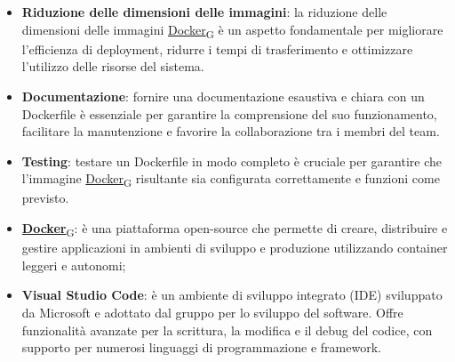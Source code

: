 \begin{itemize}
	\item \textbf{Riduzione delle dimensioni delle immagini}: la riduzione delle dimensioni delle immagini \href{https://7last.github.io/docs/rtb/documentazione-interna/glossario\#docker}{Docker\textsubscript{G}} è un aspetto fondamentale per migliorare l'efficienza di deployment, ridurre i tempi di trasferimento e ottimizzare l'utilizzo delle risorse del sistema.
	\item \textbf{Documentazione}: fornire una documentazione esaustiva e chiara con un Dockerfile è essenziale per garantire la comprensione del suo funzionamento, facilitare la manutenzione e favorire la collaborazione tra i membri del team.
	\item \textbf{Testing}: testare un Dockerfile in modo completo è cruciale per garantire che l'immagine \href{https://7last.github.io/docs/rtb/documentazione-interna/glossario\#docker}{Docker\textsubscript{G}} risultante sia configurata correttamente e funzioni come previsto.
\end{itemize}

\begin{itemize}
	\item \href{https://7last.github.io/docs/rtb/documentazione-interna/glossario\#docker}{\textbf{Docker}\textsubscript{G}}: è una piattaforma open-source che permette di creare, distribuire e gestire applicazioni in ambienti di sviluppo e produzione utilizzando container leggeri e autonomi;
	\item \textbf{Visual Studio Code}: è un ambiente di sviluppo integrato (IDE) sviluppato da Microsoft e adottato dal gruppo per lo sviluppo del software. Offre funzionalità avanzate per la scrittura, la modifica e il debug del codice, con supporto per numerosi linguaggi di programmazione e framework.
\end{itemize}
